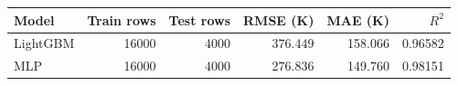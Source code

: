 \begin{tabular}{lrrrrr}
\toprule
Model & Train rows & Test rows & RMSE (K) & MAE (K) & $R^2$ \\
\midrule
LightGBM & 16000 & 4000 & 376.449 & 158.066 & 0.96582 \\
MLP & 16000 & 4000 & 276.836 & 149.760 & 0.98151 \\
\bottomrule
\end{tabular}
